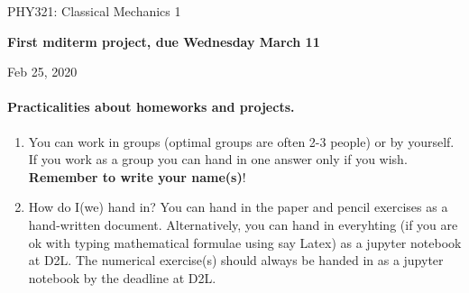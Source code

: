 \documentclass[%
oneside,                 %
final,                   %
10pt]{article}
\begin{document}

\newcommand{\exercisesection}[1]{\subsection*{#1}}






\thispagestyle{empty}

\begin{center}
{\LARGE\bf
\begin{spacing}{1.25}
PHY321: Classical Mechanics 1
\end{spacing}
}
\end{center}


\begin{center}
{\bf First mditerm project, due Wednesday March 11${}^{}$} \\ [0mm]
\end{center}

\begin{center}
\end{center}
    

\begin{center}
Feb 25, 2020
\end{center}

\vspace{1cm}


\paragraph{Practicalities about  homeworks and projects.}
\begin{enumerate}
\item You can work in groups (optimal groups are often 2-3 people) or by yourself. If you work as a group you can hand in one answer only if you wish. \textbf{Remember to write your name(s)}!

\item How do I(we)  hand in?  You can hand in the paper and pencil exercises as a hand-written document. Alternatively, you can hand in everyhting (if you are ok with typing mathematical formulae using say Latex) as a jupyter notebook at D2L. The numerical exercise(s) should always be handed in as a jupyter notebook by the deadline at D2L. 
\end{enumerate}
\end{document}
